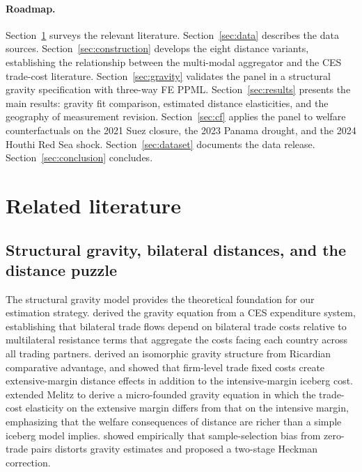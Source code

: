 \documentclass[11pt, a4paper]{article}
\begin{document}
\medskip
\paragraph*{Roadmap.}
Section~\ref{sec:lit} surveys the relevant literature.
Section~\ref{sec:data} describes the data sources.
Section~\ref{sec:construction} develops the eight distance variants, establishing
the relationship between the multi-modal aggregator and the CES trade-cost
literature.
Section~\ref{sec:gravity} validates the panel in a structural gravity
specification with three-way FE PPML.
Section~\ref{sec:results} presents the main results: gravity fit comparison,
estimated distance elasticities, and the geography of measurement revision.
Section~\ref{sec:cf} applies the panel to welfare counterfactuals on the 2021
Suez closure, the 2023 Panama drought, and the 2024 Houthi Red Sea shock.
Section~\ref{sec:dataset} documents the data release.
Section~\ref{sec:conclusion} concludes.

\section{Related literature}
\label{sec:lit}

\subsection{Structural gravity, bilateral distances, and the distance puzzle}

The structural gravity model provides the theoretical foundation for our
estimation strategy.
\citet{anderson_vanwincoop_2003} derived the gravity equation from a CES
expenditure system, establishing that bilateral trade flows depend on bilateral
trade costs relative to multilateral resistance terms that aggregate the costs
facing each country across all trading partners.
\citet{eaton_kortum_2002} derived an isomorphic gravity structure from
Ricardian comparative advantage, and \citet{melitz_2003} showed that
firm-level trade fixed costs create extensive-margin distance effects in
addition to the intensive-margin iceberg cost.
\citet{chaney_2008} extended Melitz to derive a micro-founded gravity equation
in which the trade-cost elasticity on the extensive margin differs from
that on the intensive margin, emphasizing that the welfare consequences of
distance are richer than a simple iceberg model implies.
\citet{helpman_melitz_rubinstein_2008} showed empirically that sample-selection
bias from zero-trade pairs distorts gravity estimates and proposed a two-stage
Heckman correction.
\end{document}
